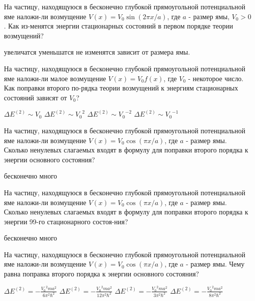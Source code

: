 \documentclass[11pt,a4paper]{exam}
\begin{document}
\begin{questions}
\question На частицу, находящуюся в бесконечно глубокой прямоугольной потенциальной яме наложи-ли возмущение $V(x) = {V_0}\sin \left( {2\pi x/a} \right)$, где $a$ - размер ямы, ${V_0} > 0$. Как из-менятся энергии стационарных состояний в первом порядке теории возмущений?
\begin{choices}
\choice увеличатся     
\choice уменьшатся  
\choice не изменятся   
\choice зависит от размера ямы.
\end{choices}

\question На частицу, находящуюся в бесконечно глубокой прямоугольной потенциальной яме наложи-ли малое возмущение $V(x) = {V_0}f(x)$, где ${V_0}$ - некоторое число. Как поправки второго по-рядка теории возмущений к энергиям стационарных состояний зависят от ${V_0}$?
\begin{choices}
\choice $\Delta {E^{(2)}} \sim {V_0}$    
\choice $\Delta {E^{(2)}} \sim {V_0}^2$     
\choice $\Delta {E^{(2)}} \sim {V_0}^{ - 2}$   
\choice $\Delta {E^{(2)}} \sim {V_0}^{ - 1}$
\end{choices}

\question На частицу, находящуюся в бесконечно глубокой прямоугольной потенциальной яме наложи-ли возмущение $V(x) = {V_0}\cos \left( {\pi x/a} \right)$, где $a$ - размер ямы. Сколько ненулевых слагаемых входят в формулу для поправки второго порядка к энергии основного состояния?
\begin{choices}
\choice бесконечно много
\end{choices}

\question На частицу, находящуюся в бесконечно глубокой прямоугольной потенциальной яме наложи-ли возмущение $V(x) = {V_0}\cos \left( {\pi x/a} \right)$, где $a$ - размер ямы. Сколько ненулевых слагаемых входят в формулу для поправки второго порядка к энергии 99-го стационарного состоя-ния?
\begin{choices}
\choice бесконечно много
\end{choices}

\question На частицу, находящуюся в бесконечно глубокой прямоугольной потенциальной яме наложи-ли возмущение $V(x) = {V_0}\cos \left( {\pi x/a} \right)$, где $a$ - размер ямы. Чему равна поправка второго порядка к энергии основного состояния?
\begin{choices}
\choice $\Delta {E^{(2)}} =  - \frac{{{V_0}^2m{a^2}}}{{6{\pi ^2}{\hbar ^2}}}$      
\choice $\Delta {E^{(2)}} =  - \frac{{{V_0}^2m{a^2}}}{{12{\pi ^2}{\hbar ^2}}}$     
\choice $\Delta {E^{(2)}} =  - \frac{{{V_0}^2m{a^2}}}{{3{\pi ^2}{\hbar ^2}}}$           
\choice $\Delta {E^{(2)}} =  - \frac{{{V_0}^2m{a^2}}}{{8{\pi ^2}{\hbar ^2}}}$
\end{choices}


\end{questions}
\end{document}
